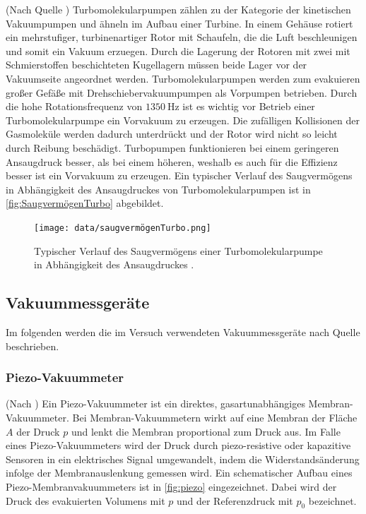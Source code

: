 (Nach Quelle \cite{Turbomolekularpumpen}) Turbomolekularpumpen zählen zu der Kategorie der kinetischen Vakuumpumpen und ähneln im Aufbau einer Turbine. In einem Gehäuse rotiert ein mehrstufiger, turbinenartiger Rotor mit Schaufeln, die die Luft beschleunigen und somit ein Vakuum erzuegen. Durch die Lagerung der 
Rotoren mit zwei mit Schmierstoffen beschichteten Kugellagern müssen beide Lager vor der Vakuumseite angeordnet werden. Turbomolekularpumpen werden zum evakuieren großer Gefäße mit Drehschiebervakuumpumpen als Vorpumpen betrieben. Durch die hohe Rotationsfrequenz von $\SI{1350}{\hertz}$ ist es wichtig vor Betrieb einer Turbomolekularpumpe ein 
Vorvakuum zu erzeugen. Die zufälligen Kollisionen der Gasmoleküle werden dadurch unterdrückt und der Rotor wird nicht so leicht durch Reibung beschädigt. Turbopumpen funktionieren bei einem geringeren Ansaugdruck besser, als bei einem höheren, weshalb es auch für die Effizienz besser ist ein Vorvakuum zu erzeugen.
Ein typischer Verlauf des Saugvermögens in Abhängigkeit des Ansaugdruckes von Turbomolekularpumpen ist in \autoref{fig:SaugvermögenTurbo} abgebildet.
 
\begin{figure}[H]
    \centering
    \texttt{[image: data/saugvermögenTurbo.png]}
    \caption{Typischer Verlauf des Saugvermögens einer Turbomolekularpumpe in Abhängigkeit des Ansaugdruckes \cite{Turbomolekularpumpen}.}
    \label{fig:SaugvermögenTurbo}
\end{figure}

\subsection{Vakuummessgeräte}
\label{subsec:vakuummesser}

Im folgenden werden die im Versuch verwendeten Vakuummessgeräte nach Quelle \cite{Totaldruckmessung} beschrieben.

\subsubsection{Piezo-Vakuummeter}
\label{subsubsec:piezo}
(Nach \cite{Druckmessung}) Ein Piezo-Vakuummeter ist ein direktes, gasartunabhängiges Membran-Vakuummeter. Bei Membran-Vakuummetern wirkt auf eine Membran der Fläche $A$ der Druck $p$ und lenkt die Membran proportional zum Druck aus.
Im Falle eines Piezo-Vakuummeters wird der Druck durch piezo-resistive oder kapazitive Sensoren in ein elektrisches Signal umgewandelt, indem die Widerstandsänderung infolge der Membranauslenkung gemessen wird.
Ein schematischer Aufbau eines Piezo-Membranvakuummeters ist in \autoref{fig:piezo} eingezeichnet. Dabei wird der Druck des evakuierten Volumens mit $p$ und der Referenzdruck mit $p_0$ bezeichnet.

